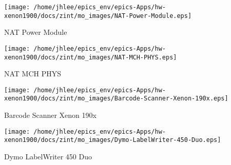 \noindent
\vspace{1.4cm}
\begin{minipage}{.2\textwidth}
\begin{center}
\texttt{[image: /home/jhlee/epics\_env/epics-Apps/hw-xenon1900/docs/zint/mo\_images/NAT-Power-Module.eps]}
\end{center}
\end{minipage}
\begin{minipage}{.7\textwidth}
NAT Power Module
\end{minipage}


\noindent
\vspace{1.4cm}
\begin{minipage}{.2\textwidth}
\begin{center}
\texttt{[image: /home/jhlee/epics\_env/epics-Apps/hw-xenon1900/docs/zint/mo\_images/NAT-MCH-PHYS.eps]}
\end{center}
\end{minipage}
\begin{minipage}{.7\textwidth}
NAT MCH PHYS
\end{minipage}


\noindent
\vspace{1.4cm}
\begin{minipage}{.2\textwidth}
\begin{center}
\texttt{[image: /home/jhlee/epics\_env/epics-Apps/hw-xenon1900/docs/zint/mo\_images/Barcode-Scanner-Xenon-190x.eps]}
\end{center}
\end{minipage}
\begin{minipage}{.7\textwidth}
Barcode Scanner Xenon 190x
\end{minipage}


\noindent
\vspace{1.4cm}
\begin{minipage}{.2\textwidth}
\begin{center}
\texttt{[image: /home/jhlee/epics\_env/epics-Apps/hw-xenon1900/docs/zint/mo\_images/Dymo-LabelWriter-450-Duo.eps]}
\end{center}
\end{minipage}
\begin{minipage}{.7\textwidth}
Dymo LabelWriter 450 Duo
\end{minipage}


